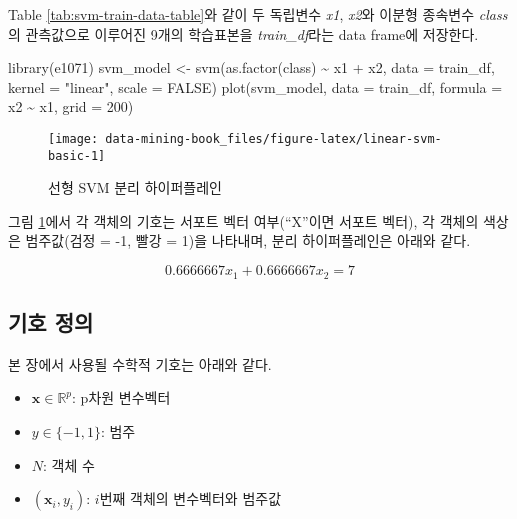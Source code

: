\documentclass[
]{book}
\newenvironment{Shaded}{\begin{snugshade}}{\end{snugshade}}
\newcommand{\AttributeTok}[1]{\textcolor[rgb]{0.77,0.63,0.00}{#1}}
\newcommand{\ConstantTok}[1]{\textcolor[rgb]{0.00,0.00,0.00}{#1}}
\newcommand{\DecValTok}[1]{\textcolor[rgb]{0.00,0.00,0.81}{#1}}
\newcommand{\FunctionTok}[1]{\textcolor[rgb]{0.00,0.00,0.00}{#1}}
\newcommand{\NormalTok}[1]{#1}
\newcommand{\OtherTok}[1]{\textcolor[rgb]{0.56,0.35,0.01}{#1}}
\newcommand{\SpecialCharTok}[1]{\textcolor[rgb]{0.00,0.00,0.00}{#1}}
\newcommand{\StringTok}[1]{\textcolor[rgb]{0.31,0.60,0.02}{#1}}
\providecommand{\tightlist}{%
  \setlength{\itemsep}{0pt}\setlength{\parskip}{0pt}}
\begin{document}
Table \ref{tab:svm-train-data-table}와 같이 두 독립변수 \emph{x1}, \emph{x2}와 이분형 종속변수 \emph{class}의 관측값으로 이루어진 9개의 학습표본을 \emph{train\_df}라는 data frame에 저장한다.

\begin{Shaded}
\begin{Highlighting}[]
\FunctionTok{library}\NormalTok{(e1071)}
\NormalTok{svm\_model }\OtherTok{\textless{}{-}} \FunctionTok{svm}\NormalTok{(}\FunctionTok{as.factor}\NormalTok{(class) }\SpecialCharTok{\textasciitilde{}}\NormalTok{ x1 }\SpecialCharTok{+}\NormalTok{ x2, }\AttributeTok{data =}\NormalTok{ train\_df, }\AttributeTok{kernel =} \StringTok{"linear"}\NormalTok{, }\AttributeTok{scale =} \ConstantTok{FALSE}\NormalTok{)}
\FunctionTok{plot}\NormalTok{(svm\_model, }\AttributeTok{data =}\NormalTok{ train\_df, }\AttributeTok{formula =}\NormalTok{ x2 }\SpecialCharTok{\textasciitilde{}}\NormalTok{ x1, }\AttributeTok{grid =} \DecValTok{200}\NormalTok{)}
\end{Highlighting}
\end{Shaded}

\begin{figure}

{\centering \texttt{[image: data-mining-book\_files/figure-latex/linear-svm-basic-1]} 

}

\caption{선형 SVM 분리 하이퍼플레인}\label{fig:linear-svm-basic}
\end{figure}

그림 \ref{fig:linear-svm-basic}에서 각 객체의 기호는 서포트 벡터 여부(``X''이면 서포트 벡터), 각 객체의 색상은 범주값(검정 = -1, 빨강 = 1)을 나타내며, 분리 하이퍼플레인은 아래와 같다.

\[
0.6666667 x_{1} + 0.6666667 x_{2} = 7
\]

\hypertarget{linear-svm-notation}{%
\subsection{기호 정의}\label{linear-svm-notation}}

본 장에서 사용될 수학적 기호는 아래와 같다.

\begin{itemize}
\tightlist
\item
  \(\mathbf{x} \in \mathbb{R}^p\): p차원 변수벡터
\item
  \(y \in \{-1, 1\}\): 범주
\item
  \(N\): 객체 수
\item
  \((\mathbf{x}_i, y_i)\): \(i\)번째 객체의 변수벡터와 범주값
\end{itemize}
\end{document}
